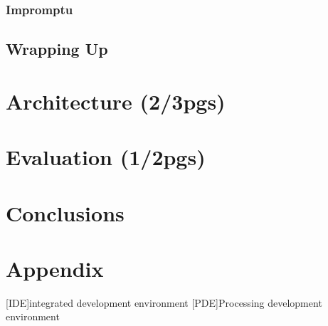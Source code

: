 \documentclass{./llncs2e/llncs}
\begin{document}
\subsubsection{Impromptu\cite{sorensen2005impromptu}}

\subsection{Wrapping Up}

\section{Architecture (2/3pgs)}

\section{Evaluation (1/2pgs)}

\section{Conclusions}

\newpage
\appendix
\section{Appendix}
\label{sec:attachments}

\begin{acronym}
[IDE]{integrated development environment}
[PDE]{Processing development environment}
\end{acronym}

% 
% 
 

 
\end{document}
